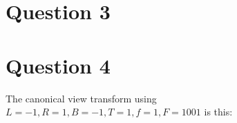 \documentclass{article} %
\begin{document}
\newpage
\section{Question 3}



\newpage
\section{Question 4}
The canonical view transform using $L=-1, R = 1, B = -1, T = 1, f = 1, F=1001$ is this:
\end{document}
